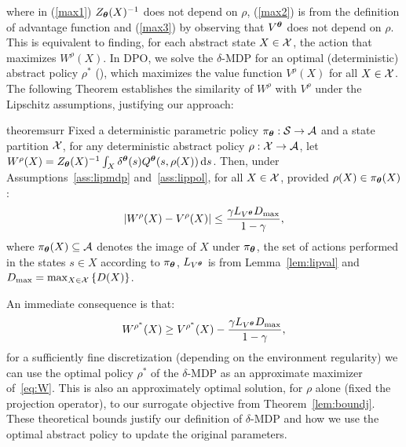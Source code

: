 where in (\ref{max1}) $Z_{\boldsymbol{\theta}}(X)^{-1}$ does not depend on $\rho$, (\ref{max2}) is from the definition of advantage function and (\ref{max3}) by observing that $V^{\boldsymbol{\theta}}$ does not depend on $\rho$.
This is equivalent to finding, for each abstract state $X\in\mathcal{X}$, the action that maximizes $W^{\rho}(X)$. In \ac{DPO}, we solve the $\delta$-\ac{MDP} for an optimal (deterministic) abstract policy $\rho^{*}$ (), which maximizes the value function $V^{\rho}(X)$ for all $X\in\mathcal{X}$. The following Theorem establishes the similarity of $W^{\rho}$ with $V^{\rho}$ under the Lipschitz assumptions, justifying our approach:
%
\begin{restatable}{theorem}{surr}\label{lem:surr}
	Fixed a deterministic parametric policy ${\pi_{\boldsymbol{\theta}}:\mathcal{S}\to\mathcal{A}}$ and a state partition $\mathcal{X}$, for any deterministic abstract policy $\rho:\mathcal{X}\to\mathcal{A}$, let $W^{\rho}(X) = Z_{\boldsymbol{\theta}}(X)^{-1}\int_{X}\delta^{\boldsymbol{\theta}}(s)Q^{\boldsymbol{\theta}}(s,\rho(X))\,\mathrm{d} s$. Then, under Assumptions~\ref{ass:lipmdp} and~\ref{ass:lippol}, for all $X\in\mathcal{X}$, provided $\rho(X) \in \pi_{\boldsymbol{\theta}}(X)$:
	\begin{align*}
	|W^{\rho}(X) - V^{\rho}(X)| \leq \frac{\gamma L_{V^{\boldsymbol{\theta}}}D_{\max}}{1-\gamma},
	\end{align*}
	where $\pi_{\boldsymbol{\theta}}(X)\subseteq\mathcal{A}$ denotes the image of $X$ under $\pi_{\boldsymbol{\theta}}$, \ie the set of actions performed in the states $s \in X$ according to $\pi_{\boldsymbol{\theta}}$, $L_{V^{\boldsymbol{\theta}}}$ is from Lemma~\ref{lem:lipval} and $D_{\max} = \max_{X\in\mathcal{X}}\left\{D(X)\right\}$.
\end{restatable}
%
\noindent An immediate consequence is that: 
\begin{align}\label{eq:wstar}
W^{\rho^*}(X) \geq V^{\rho^*}(X) - \frac{\gamma L_{V^{\boldsymbol{\theta}}}D_{\max}}{1-\gamma},
\end{align}
\ie for a sufficiently fine discretization (depending on the environment regularity) we can use the optimal policy $\rho^{*}$ of the $\delta$-\ac{MDP} as an approximate maximizer of~\eqref{eq:W}. This is also an approximately optimal solution, for $\rho$ alone (fixed the projection operator), to our surrogate objective from Theorem~\ref{lem:boundj}.
%
These theoretical bounds justify our definition of $\delta$-\ac{MDP} and how we use the optimal abstract policy to update the original parameters.\\
\newline
